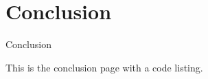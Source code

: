 \section{Conclusion}

Conclusion

This is the conclusion page with a code listing.


\blindtext[2]


% 


